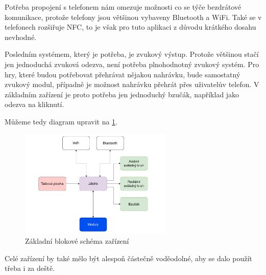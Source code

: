 Potřeba propojení s telefonem nám omezuje možnosti co se týče bezdrátové komunikace, protože telefony jsou většinou vybaveny Bluetooth a WiFi.
Také se v telefonech rozšiřuje NFC, to je však pro tuto aplikaci z důvodu krátkého dosahu nevhodné.

Posledním systémem, který je potřeba, je zvukový výstup.
Protože většinou stačí jen jednoduchá zvuková odezva, není potřeba plnohodnotný zvukový systém.
Pro hry, které budou potřebovat přehrávat nějakou nahrávku, bude samostatný zvukový modul, případně je možnost nahrávku přehrát přes uživatelův telefon.
V základním zařízení je proto potřeba jen jednoduchý bzučák, například jako odezva na kliknutí.

Můžeme tedy diagram upravit na \ref{fig:diagram_zanoreni_1}.
\begin{figure}[h]
    \centering
    \includegraphics[width=0.65\textwidth]{text/TeoretickyUvod/AplikaceHernichZarizeni/diagram/zanoreni_1.pdf}
    \caption{Základní blokové schéma zařízení}
    \label{fig:diagram_zanoreni_1}
\end{figure}

Celé zařízení by také mělo být alespoň částečně voděodolné, aby se dalo použít třeba i za deště.

\vspace{-10mm}